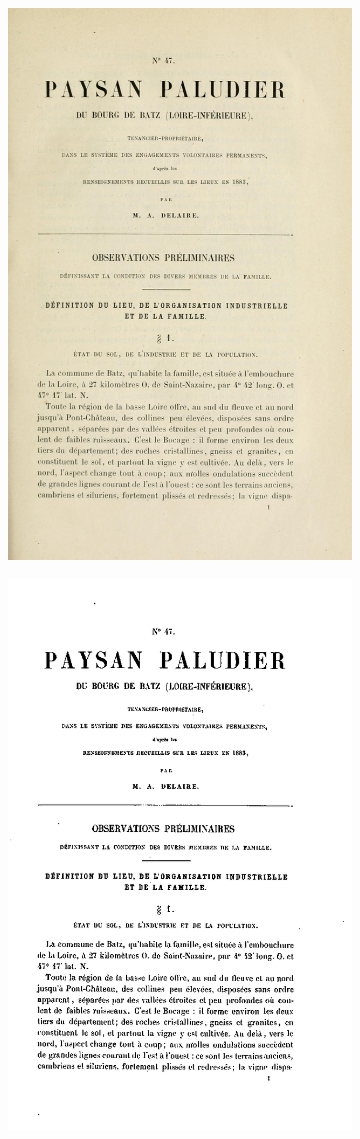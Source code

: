 \begin{figure}[h]
    \centering
    \begin{subfigure}[t]{0.4\textwidth}
     \includegraphics[width=0.7\linewidth]{img/title_s2t1_m47_p1.png}
    \end{subfigure}
    \hspace{5pt}
    \begin{subfigure}[t]{0.4\textwidth}
     \includegraphics[width=0.7\linewidth]{img/title_binarize.png}

\end{subfigure}
\end{figure}
